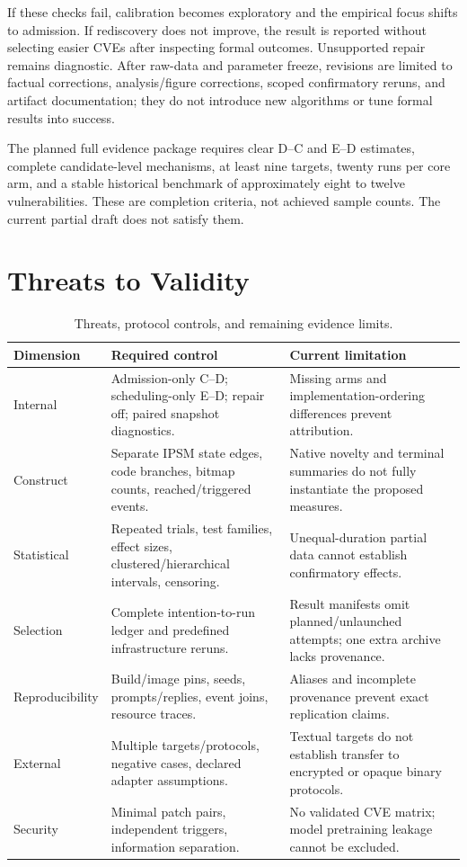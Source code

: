 \documentclass[final,5p,times,number]{elsarticle}
\begin{document}
If these checks fail, calibration becomes exploratory and the empirical focus shifts to admission. If rediscovery does not improve, the result is reported without selecting easier CVEs after inspecting formal outcomes. Unsupported repair remains diagnostic. After raw-data and parameter freeze, revisions are limited to factual corrections, analysis/figure corrections, scoped confirmatory reruns, and artifact documentation; they do not introduce new algorithms or tune formal results into success.

The planned full evidence package requires clear D--C and E--D estimates, complete candidate-level mechanisms, at least nine targets, twenty runs per core arm, and a stable historical benchmark of approximately eight to twelve vulnerabilities. These are completion criteria, not achieved sample counts. The current partial draft does not satisfy them.

\section{Threats to Validity}
\label{sec:threats}
\begin{table}[t]
\centering\small
\caption{Threats, protocol controls, and remaining evidence limits.}
\label{tab:threats}
\begin{tabularx}{\textwidth}{l Y Y}
\toprule
Dimension & Required control & Current limitation \\
\midrule
Internal & Admission-only C--D; scheduling-only E--D; repair off; paired snapshot diagnostics. & Missing arms and implementation-ordering differences prevent attribution. \\
Construct & Separate IPSM state edges, code branches, bitmap counts, reached/triggered events. & Native novelty and terminal summaries do not fully instantiate the proposed measures. \\
Statistical & Repeated trials, test families, effect sizes, clustered/hierarchical intervals, censoring. & Unequal-duration partial data cannot establish confirmatory effects. \\
Selection & Complete intention-to-run ledger and predefined infrastructure reruns. & Result manifests omit planned/unlaunched attempts; one extra archive lacks provenance. \\
Reproducibility & Build/image pins, seeds, prompts/replies, event joins, resource traces. & Aliases and incomplete provenance prevent exact replication claims. \\
External & Multiple targets/protocols, negative cases, declared adapter assumptions. & Textual targets do not establish transfer to encrypted or opaque binary protocols. \\
Security & Minimal patch pairs, independent triggers, information separation. & No validated CVE matrix; model pretraining leakage cannot be excluded. \\
\bottomrule
\end{tabularx}
\end{table}
\end{document}
